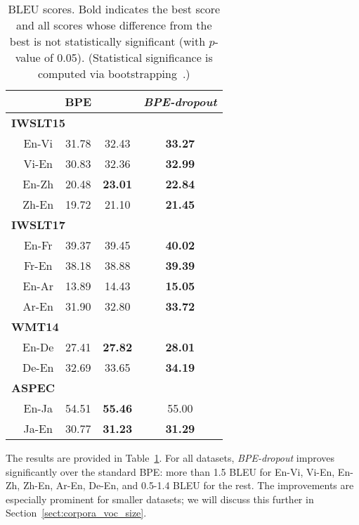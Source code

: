 \documentclass[11pt,a4paper]{article}
\begin{document}
\begin{table}[t!]
\centering
\begin{tabular}{lcccc}
\toprule

 & & BPE  & \citet{sentencepiece} & \textit{BPE-dropout}\\

\midrule
\multicolumn{5}{l}{\!\!\!\bf IWSLT15}\\
&\!\!\!\!\!\! En-Vi & 31{.}78 & 32{.}43 & \bf{33{.}27} \\
&\!\!\!\!\!\! Vi-En & 30{.}83 & 32{.}36 & \bf{32{.}99} \\
&\!\!\!\!\!\! En-Zh & 20.48 & \bf{23.01}  & \bf{22.84} \\
&\!\!\!\!\!\! Zh-En & 19.72 & 21.10 & \bf{21.45} \\
\midrule
\multicolumn{5}{l}{\!\!\!\bf IWSLT17}\\
&\!\!\!\!\!\! En-Fr & 39{.}37 &	39{.}45 &	\bf{40{.}02} \\
&\!\!\!\!\!\! Fr-En & 38{.}18 &	38{.}88 &	\bf{39{.}39} \\
&\!\!\!\!\!\! En-Ar & 13.89 & 14.43 & \bf{15.05} \\
&\!\!\!\!\!\! Ar-En & 31.90 & 32.80 & \bf{33.72} \\
\midrule
\multicolumn{5}{l}{\!\!\!\bf WMT14}\\
&\!\!\!\!\!\! En-De & 27.41 & \bf{27.82} & \bf{28.01}  \\
&\!\!\!\!\!\! De-En & 32.69 & 33.65 & \bf{34.19}\\
\midrule
\multicolumn{5}{l}{\!\!\!\bf ASPEC}\\
&\!\!\!\!\!\! En-Ja & 54.51 & \bf{55.46} & 55.00 \\
&\!\!\!\!\!\! Ja-En & 30.77 & \bf{31.23} & \bf{31.29} \\

\bottomrule
\end{tabular}
\caption{BLEU scores. Bold indicates the best score and all scores whose difference from the best is not statistically significant (with $p$-value of 0.05). (Statistical significance is computed via bootstrapping~\cite{koehn2004statistical}.)}
\label{tab:main}
\end{table}


The results are provided in Table~\ref{tab:main}.
For all datasets, \textit{BPE-dropout} improves
significantly over the standard BPE: more than 1{.}5 BLEU for En-Vi, Vi-En, En-Zh, Zh-En, Ar-En, De-En,  and 0{.}5-1{.}4 BLEU for the rest. The improvements are especially prominent for smaller datasets; we will discuss this further in Section~\ref{sect:corpora_voc_size}.
\end{document}
